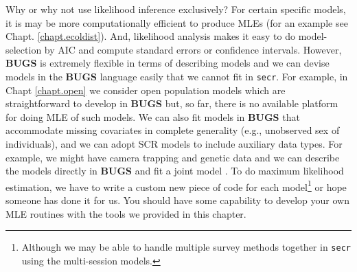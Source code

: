 \begin{comment}
To compute the marginal (integrated) likelihood we have to precisely describe the
state-space of the underlying point process. In practice, this leads
to a ``buffer'' around the trap array. We note that this is not really a
``buffer strip'' in the sense of \citet{wilson_anderson:1985a},  
but it is somewhat more general here. In particular,
it establishes the support of the integrand and, 
in SCR models, it is an element of the model that
provides an explicit
linkage between population size $N$ and density $D$.
As a practical 
matter, it will typically be the case that, while estimates of $N$
increase with the area of the state-space (as they should!), estimates of density
stabilize. This is not a feature of the classical methods based on
using model $M_0$ or model $M_h$ and buffering the trap array.
\end{comment}

Why or why not use likelihood inference exclusively? For certain
specific models, it is may be more computationally efficient to
produce MLEs (for an example see Chapt. \ref{chapt.ecoldist}).  And,
likelihood analysis makes it easy to do model-selection by AIC and
compute standard errors or confidence intervals.  However, {\bf BUGS}
is extremely flexible in terms of describing models and
we can devise models in the {\bf
  BUGS} language easily that we cannot fit in \mbox{\tt secr}. For
example, in Chapt \ref{chapt.open} we consider open population models
which are straightforward to develop in {\bf BUGS} but, so far, there
is no available platform for doing MLE of such models.
We can also fit models in {\bf BUGS} that
accommodate missing covariates in complete generality (e.g.,
unobserved sex of individuals), and we can adopt SCR models to include
auxiliary data types. For example, we might have camera trapping and
genetic data and we can describe the models directly in {\bf BUGS} and
fit a joint model \citep{gopalaswamy_etal:2012ecol}. To do maximum
likelihood estimation, we 
have to write a custom new piece of code for each
model\footnote{Although we may be able to handle multiple survey
  methods together in \mbox{\tt secr} using the multi-session models.} or hope
someone has done it for us. You should have some capability to develop
your own MLE routines 
with the tools we provided in this chapter. 



